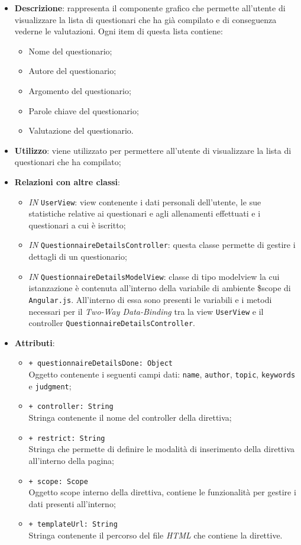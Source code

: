 \begin{itemize}
	\item \textbf{Descrizione}: rappresenta il componente grafico che permette all'utente di visualizzare la lista di questionari che ha già compilato e di conseguenza vederne le valutazioni. Ogni item di questa lista contiene:
	\begin{itemize}
		\item Nome del questionario;
		\item Autore del questionario;
		\item Argomento del questionario;
		\item Parole chiave del questionario;
		\item Valutazione del questionario.
	\end{itemize}
	\item \textbf{Utilizzo}: viene utilizzato per permettere all'utente di visualizzare la lista di questionari che ha compilato;
	\item \textbf{Relazioni con altre classi}: 
	\begin{itemize}
		\item \textit{IN} \texttt{UserView}: view contenente i dati personali dell'utente, le sue statistiche relative ai questionari e agli allenamenti effettuati e i questionari a cui è iscritto;
		\item \textit{IN} \texttt{QuestionnaireDetailsController}: questa classe permette di gestire i dettagli di un questionario;
		\item \textit{IN} \texttt{QuestionnaireDetailsModelView}: classe di tipo modelview la cui istanzazione è contenuta all'interno della variabile di ambiente \$scope di \texttt{Angular.js}. All'interno di essa sono presenti le variabili e i metodi necessari per il \textit{Two-Way Data-Binding} tra la view \texttt{UserView} e il controller \texttt{QuestionnaireDetailsController}.
	\end{itemize}
	\item \textbf{Attributi}: 
	\begin{itemize}
		\item \texttt{+ questionnaireDetailsDone: Object} \\ Oggetto contenente i seguenti campi dati: \texttt{name}, \texttt{author}, \texttt{topic}, \texttt{keywords} e \texttt{judgment};
		\item \texttt{+ controller: String} \\ Stringa contenente il nome del controller della direttiva;
		\item \texttt{+ restrict: String} \\ Stringa che permette di definire le modalità di inserimento della direttiva all'interno della pagina;
		\item \texttt{+ scope: Scope}\\ Oggetto scope interno della direttiva, contiene le funzionalità per gestire i dati presenti all'interno;
		\item \texttt{+ templateUrl: String}\\ Stringa contenente il percorso del file \textit{HTML} che contiene la direttive.
	\end{itemize}
\end{itemize}